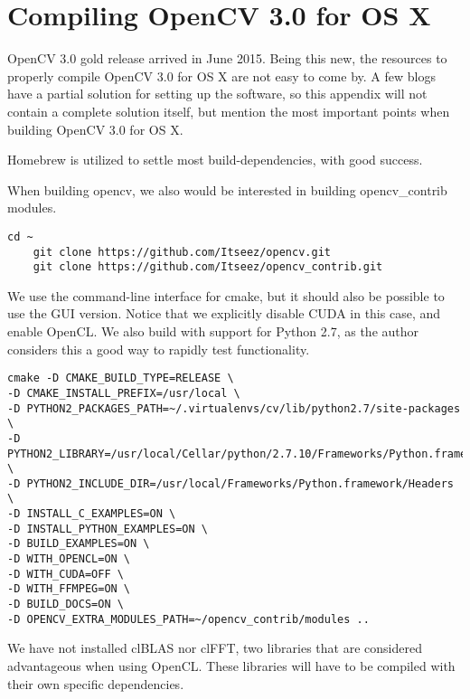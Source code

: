 \chapter{Compiling OpenCV 3.0 for OS X}
OpenCV 3.0 gold release arrived in June 2015. Being this new, the resources to properly compile OpenCV 3.0 for OS X are not easy to come by. A few blogs have a partial solution for setting up the software, so this appendix will not contain a complete solution itself, but mention the most important points when building OpenCV 3.0 for OS X.

Homebrew is utilized to settle most build-dependencies, with good success.

When building opencv, we also would be interested in building opencv\_contrib modules.

\begin{lstlisting}[style=BashInputStyle]
    cd ~
    git clone https://github.com/Itseez/opencv.git
    git clone https://github.com/Itseez/opencv_contrib.git
\end{lstlisting}

We use the command-line interface for cmake, but it should also be possible to use the GUI version. Notice that we explicitly disable CUDA in this case, and enable OpenCL. We also build with support for Python 2.7, as the author considers this a good way to rapidly test functionality.

\begin{lstlisting}[style=BashInputStyle]
cmake -D CMAKE_BUILD_TYPE=RELEASE \
-D CMAKE_INSTALL_PREFIX=/usr/local \
-D PYTHON2_PACKAGES_PATH=~/.virtualenvs/cv/lib/python2.7/site-packages \
-D PYTHON2_LIBRARY=/usr/local/Cellar/python/2.7.10/Frameworks/Python.framework/Versions/2.7/bin \
-D PYTHON2_INCLUDE_DIR=/usr/local/Frameworks/Python.framework/Headers \
-D INSTALL_C_EXAMPLES=ON \
-D INSTALL_PYTHON_EXAMPLES=ON \
-D BUILD_EXAMPLES=ON \
-D WITH_OPENCL=ON \
-D WITH_CUDA=OFF \
-D WITH_FFMPEG=ON \
-D BUILD_DOCS=ON \
-D OPENCV_EXTRA_MODULES_PATH=~/opencv_contrib/modules ..
\end{lstlisting}

We have not installed clBLAS nor clFFT, two libraries that are considered advantageous when using OpenCL. These libraries will have to be compiled with their own specific dependencies.